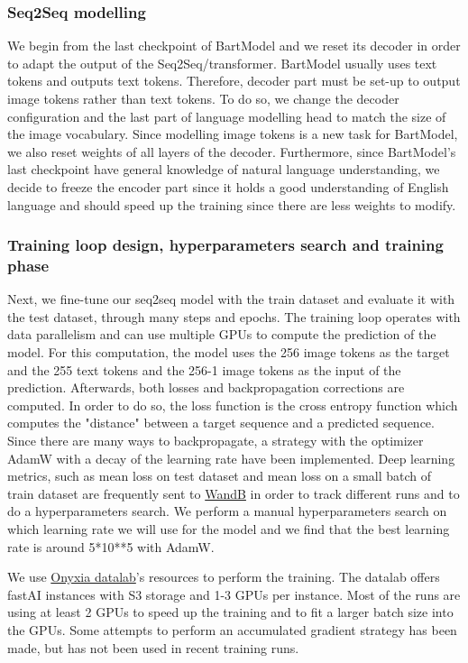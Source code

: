 \documentclass{article}
\begin{document}
\subsubsection{Seq2Seq modelling}
We begin from the last checkpoint of BartModel and we reset its decoder in order to adapt the output of the Seq2Seq/transformer. BartModel usually uses text tokens and outputs text tokens. Therefore, decoder part must be set-up to output image tokens rather than text tokens. To do so, we change the decoder configuration and the last part of language modelling head to match the size of the image vocabulary. Since modelling image tokens is a new task for BartModel, we also reset weights of all layers of the decoder.
Furthermore, since BartModel's last checkpoint have general knowledge of natural language understanding, we decide to freeze the encoder part since it holds a good understanding of English language and should speed up the training since there are less weights to modify.

\subsubsection{Training loop design, hyperparameters search and training phase}
Next, we fine-tune our seq2seq model with the train dataset and evaluate it with the test dataset, through many steps and epochs. The training loop operates with data parallelism and can use multiple GPUs to compute the prediction of the model. For this computation, the model uses the 256 image tokens as the target and the 255 text tokens and the 256-1 image tokens as the input of the prediction.
Afterwards, both losses and backpropagation corrections are computed. In order to do so, the loss function is the cross entropy function which computes the "distance" between a target sequence and a predicted sequence. Since there are many ways to backpropagate, a strategy with the optimizer AdamW with a decay of the learning rate have been implemented.
Deep learning metrics, such as mean loss on test dataset and mean loss on a small batch of train dataset are frequently sent to \href{https://wandb.ai/cthiounn/dalle-tiny}{WandB} in order to track different runs and to do a hyperparameters search.
We perform a manual hyperparameters search on which learning rate we will use for the model and we find that the best learning rate is around 5*10**5 with AdamW.

We use \href{https://datalab.sspcloud.fr/}{Onyxia datalab}'s resources to perform the training. The datalab offers fastAI instances with S3 storage and 1-3 GPUs per instance. Most of the runs are using at least 2 GPUs to speed up the training and to fit a larger batch size into the GPUs. Some attempts to perform an accumulated gradient strategy has been made, but has not been used in recent training runs.
\end{document}
